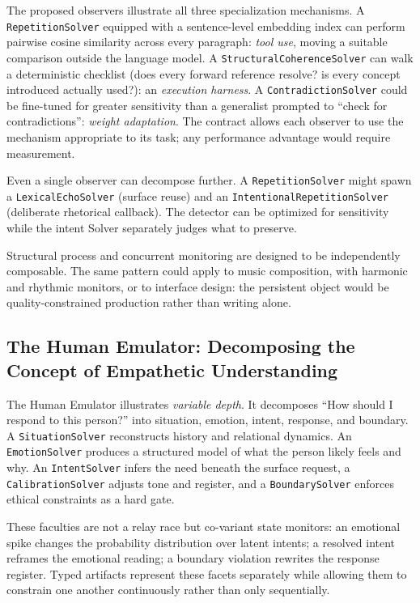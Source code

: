 \documentclass[11pt]{article}
\let\oldtexttt\texttt
\renewcommand{\texttt}[1]{\oldtexttt{\small #1}}
\begin{document}
The proposed observers illustrate all three specialization mechanisms. A \texttt{RepetitionSolver} equipped with a sentence-level embedding index can perform pairwise cosine similarity across every paragraph: \emph{tool use}, moving a suitable comparison outside the language model. A \texttt{StructuralCoherenceSolver} can walk a deterministic checklist (does every forward reference resolve? is every concept introduced actually used?): an \emph{execution harness}. A \texttt{ContradictionSolver} could be fine-tuned for greater sensitivity than a generalist prompted to ``check for contradictions'': \emph{weight adaptation}. The contract allows each observer to use the mechanism appropriate to its task; any performance advantage would require measurement.

Even a single observer can decompose further. A \texttt{RepetitionSolver} might spawn a \texttt{LexicalEchoSolver} (surface reuse) and an \texttt{IntentionalRepetitionSolver} (deliberate rhetorical callback). The detector can be optimized for sensitivity while the intent Solver separately judges what to preserve.

Structural process and concurrent monitoring are designed to be independently composable. The same pattern could apply to music composition, with harmonic and rhythmic monitors, or to interface design: the persistent object would be quality-constrained production rather than writing alone.

\subsection{The Human Emulator: Decomposing the Concept of Empathetic Understanding}
\label{sec:hep}

The Human Emulator illustrates \emph{variable depth}. It decomposes ``How should I respond to this person?'' into situation, emotion, intent, response, and boundary. A \texttt{SituationSolver} reconstructs history and relational dynamics. An \texttt{EmotionSolver} produces a structured model of what the person likely feels and why. An \texttt{IntentSolver} infers the need beneath the surface request, a \texttt{CalibrationSolver} adjusts tone and register, and a \texttt{BoundarySolver} enforces ethical constraints as a hard gate.

These faculties are not a relay race but co-variant state monitors: an emotional spike changes the probability distribution over latent intents; a resolved intent reframes the emotional reading; a boundary violation rewrites the response register. Typed artifacts represent these facets separately while allowing them to constrain one another continuously rather than only sequentially.
\end{document}
